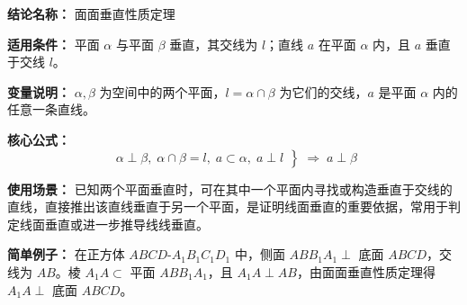 \textbf{结论名称：} 面面垂直性质定理

\textbf{适用条件：} 平面 $\alpha$ 与平面 $\beta$ 垂直，其交线为 $l$；直线 $a$ 在平面 $\alpha$ 内，且 $a$ 垂直于交线 $l$。

\textbf{变量说明：} $\alpha,\beta$ 为空间中的两个平面，$l=\alpha\cap\beta$ 为它们的交线，$a$ 是平面 $\alpha$ 内的任意一条直线。

\textbf{核心公式：}
\[
\boxed{\left.\begin{array}{c}
\alpha\perp\beta,\; \alpha\cap\beta=l,\; a\subset\alpha,\; a\perp l
\end{array}\right\} \;\Longrightarrow\; a\perp\beta}
\]

\textbf{使用场景：} 已知两个平面垂直时，可在其中一个平面内寻找或构造垂直于交线的直线，直接推出该直线垂直于另一个平面，是证明线面垂直的重要依据，常用于判定线面垂直或进一步推导线线垂直。

\textbf{简单例子：} 在正方体 $ABCD$-$A_1B_1C_1D_1$ 中，侧面 $ABB_1A_1\perp$ 底面 $ABCD$，交线为 $AB$。棱 $A_1A\subset$ 平面 $ABB_1A_1$，且 $A_1A\perp AB$，由面面垂直性质定理得 $A_1A\perp$ 底面 $ABCD$。